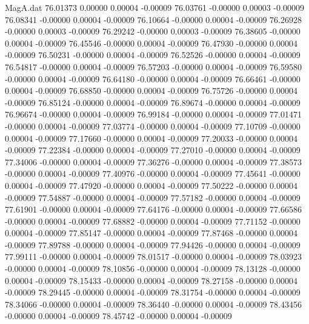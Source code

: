 \begin{filecontents}{MagA.dat}
  76.01373    0.00000    0.00004   -0.00009
  76.03761   -0.00000    0.00003   -0.00009
  76.08341   -0.00000    0.00004   -0.00009
  76.10664   -0.00000    0.00004   -0.00009
  76.26928   -0.00000    0.00003   -0.00009
  76.29242   -0.00000    0.00003   -0.00009
  76.38605   -0.00000    0.00004   -0.00009
  76.45546   -0.00000    0.00004   -0.00009
  76.47930   -0.00000    0.00004   -0.00009
  76.50231   -0.00000    0.00004   -0.00009
  76.52526   -0.00000    0.00004   -0.00009
  76.54817   -0.00000    0.00004   -0.00009
  76.57203   -0.00000    0.00004   -0.00009
  76.59580   -0.00000    0.00004   -0.00009
  76.64180   -0.00000    0.00004   -0.00009
  76.66461   -0.00000    0.00004   -0.00009
  76.68850   -0.00000    0.00004   -0.00009
  76.75726   -0.00000    0.00004   -0.00009
  76.85124   -0.00000    0.00004   -0.00009
  76.89674   -0.00000    0.00004   -0.00009
  76.96674   -0.00000    0.00004   -0.00009
  76.99184   -0.00000    0.00004   -0.00009
  77.01471   -0.00000    0.00004   -0.00009
  77.03774   -0.00000    0.00004   -0.00009
  77.10709   -0.00000    0.00004   -0.00009
  77.17660   -0.00000    0.00004   -0.00009
  77.20033   -0.00000    0.00004   -0.00009
  77.22384   -0.00000    0.00004   -0.00009
  77.27010   -0.00000    0.00004   -0.00009
  77.34006   -0.00000    0.00004   -0.00009
  77.36276   -0.00000    0.00004   -0.00009
  77.38573   -0.00000    0.00004   -0.00009
  77.40976   -0.00000    0.00004   -0.00009
  77.45641   -0.00000    0.00004   -0.00009
  77.47920   -0.00000    0.00004   -0.00009
  77.50222   -0.00000    0.00004   -0.00009
  77.54887   -0.00000    0.00004   -0.00009
  77.57182   -0.00000    0.00004   -0.00009
  77.61901   -0.00000    0.00004   -0.00009
  77.64176   -0.00000    0.00004   -0.00009
  77.66586   -0.00000    0.00004   -0.00009
  77.68882   -0.00000    0.00004   -0.00009
  77.71152   -0.00000    0.00004   -0.00009
  77.85147   -0.00000    0.00004   -0.00009
  77.87468   -0.00000    0.00004   -0.00009
  77.89788   -0.00000    0.00004   -0.00009
  77.94426   -0.00000    0.00004   -0.00009
  77.99111   -0.00000    0.00004   -0.00009
  78.01517   -0.00000    0.00004   -0.00009
  78.03923   -0.00000    0.00004   -0.00009
  78.10856   -0.00000    0.00004   -0.00009
  78.13128   -0.00000    0.00004   -0.00009
  78.15433   -0.00000    0.00004   -0.00009
  78.27158   -0.00000    0.00004   -0.00009
  78.29445   -0.00000    0.00004   -0.00009
  78.31754   -0.00000    0.00004   -0.00009
  78.34066   -0.00000    0.00004   -0.00009
  78.36440   -0.00000    0.00004   -0.00009
  78.43456   -0.00000    0.00004   -0.00009
  78.45742   -0.00000    0.00004   -0.00009

\end{filecontents}
